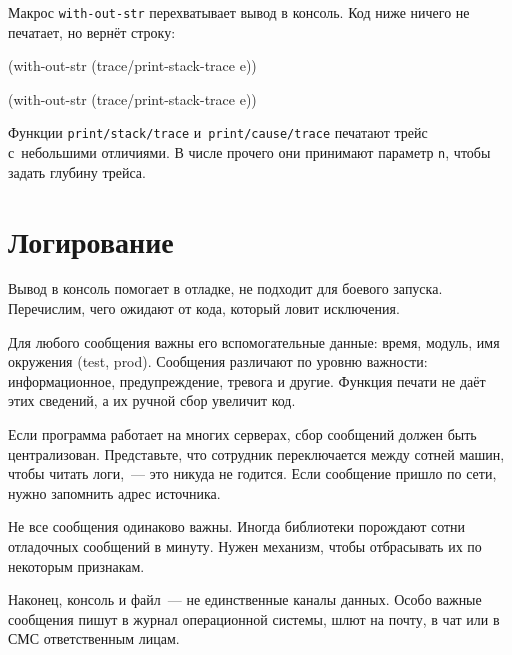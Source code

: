 \fi

Макрос \verb|with-out-str| перехватывает вывод в консоль. Код ниже ничего не
печатает, но вернёт строку:

\ifnarrow

\begin{english}
  \begin{clojure}
(with-out-str
  (trace/print-stack-trace
    e))
  \end{clojure}
\end{english}

\else

\begin{english}
  \begin{clojure}
(with-out-str
  (trace/print-stack-trace e))
  \end{clojure}
\end{english}

\fi

Функции \texttt{print\-/stack\-/trace} и~\texttt{print\-/cause\-/trace} печатают
трейс с~небольшими отличиями. В числе прочего они принимают параметр \verb|n|,
чтобы задать глубину трейса.

\section{Логирование}


Вывод в консоль помогает в отладке, не подходит для боевого
запуска. Перечислим, чего ожидают от кода, который ловит исключения.

Для любого сообщения важны его вспомогательные данные: время, модуль, имя
окружения (test, prod). Сообщения различают по уровню важности: информационное,
предупреждение, тревога и другие. Функция печати не даёт этих сведений, а их
ручной сбор увеличит код.

Если программа работает на многих серверах, сбор сообщений должен быть
централизован. Представьте, что сотрудник переключается между сотней машин,
чтобы читать логи,~--- это никуда не годится. Если сообщение пришло по сети,
нужно запомнить адрес источника.

Не все сообщения одинаково важны. Иногда библиотеки порождают сотни отладочных
сообщений в минуту. Нужен механизм, чтобы отбрасывать их по некоторым признакам.

Наконец, консоль и файл~--- не единственные каналы данных. Особо важные
сообщения пишут в журнал операционной системы, шлют на почту, в чат или в СМС
ответственным лицам.

